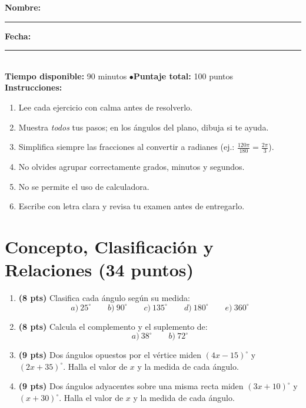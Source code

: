 \documentclass[12pt, letterpaper]{article}
\begin{document}


\vspace{4pt}
\begin{cuadroinfo}
  \small
  \textbf{Nombre:} \rule{0.55\linewidth}{0.4pt} \quad \textbf{Fecha:} \rule{0.15\linewidth}{0.4pt} \\[6pt]
  \textbf{Tiempo disponible:} 90 minutos \quad$\bullet$\quad \textbf{Puntaje total:} 100 puntos \\[4pt]
  \textbf{Instrucciones:}
  \begin{enumerate}[leftmargin=*]
    \item Lee cada ejercicio con calma antes de resolverlo.
    \item Muestra \emph{todos} tus pasos; en los ángulos del plano, dibuja si te ayuda.
    \item Simplifica siempre las fracciones al convertir a radianes (ej.: $\frac{120\pi}{180} = \frac{2\pi}{3}$).
    \item No olvides agrupar correctamente grados, minutos y segundos.
    \item No se permite el uso de calculadora.
    \item Escribe con letra clara y revisa tu examen antes de entregarlo.
  \end{enumerate}
\end{cuadroinfo}

\vspace{8pt}

\section{Concepto, Clasificación y Relaciones (34 puntos)}

\begin{enumerate}[leftmargin=*]
  \item \textbf{(8 pts)} Clasifica cada ángulo según su medida:
        \[
          a)\ 25^{\circ} \qquad b)\ 90^{\circ} \qquad c)\ 135^{\circ} \qquad d)\ 180^{\circ} \qquad e)\ 360^{\circ}
        \]

  \item \textbf{(8 pts)} Calcula el complemento y el suplemento de:
        \[
          a)\ 38^{\circ} \qquad b)\ 72^{\circ}
        \]

  \item \textbf{(9 pts)} Dos ángulos opuestos por el vértice miden $(4x - 15)^{\circ}$ y $(2x + 35)^{\circ}$. Halla el valor de $x$ y la medida de cada ángulo.

  \item \textbf{(9 pts)} Dos ángulos adyacentes sobre una misma recta miden $(3x + 10)^{\circ}$ y $(x + 30)^{\circ}$. Halla el valor de $x$ y la medida de cada ángulo.
\end{enumerate}
\end{document}
